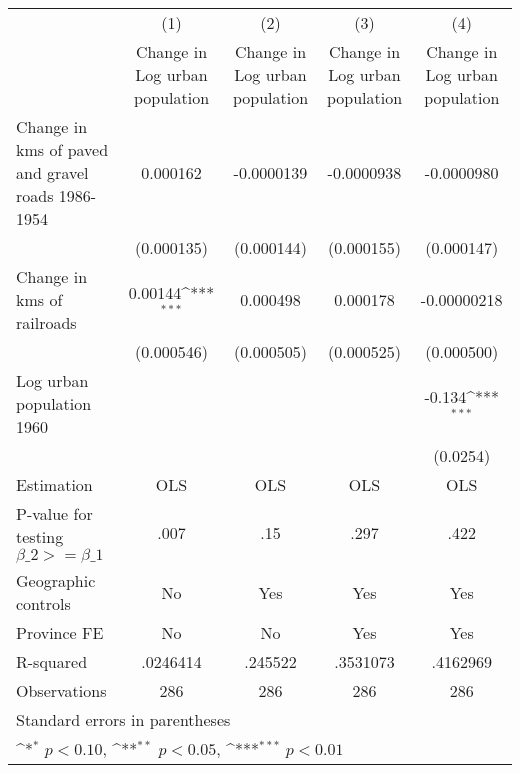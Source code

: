 {
\def\sym#1{\ifmmode^{#1}\else\(^{#1}\)\fi}
\begin{tabular}{l*{4}{c}}
\hline\hline
                    &\multicolumn{1}{c}{(1)}&\multicolumn{1}{c}{(2)}&\multicolumn{1}{c}{(3)}&\multicolumn{1}{c}{(4)}\\
                    &\multicolumn{1}{c}{Change in Log urban population}&\multicolumn{1}{c}{Change in Log urban population}&\multicolumn{1}{c}{Change in Log urban population}&\multicolumn{1}{c}{Change in Log urban population}\\
\hline
Change in kms of paved and gravel roads 1986-1954&    0.000162         &  -0.0000139         &  -0.0000938         &  -0.0000980         \\
                    &  (0.000135)         &  (0.000144)         &  (0.000155)         &  (0.000147)         \\
[1em]
Change in kms of railroads&     0.00144\sym{***}&    0.000498         &    0.000178         & -0.00000218         \\
                    &  (0.000546)         &  (0.000505)         &  (0.000525)         &  (0.000500)         \\
[1em]
Log urban population 1960&                     &                     &                     &      -0.134\sym{***}\\
                    &                     &                     &                     &    (0.0254)         \\
\hline
Estimation          &         OLS         &         OLS         &         OLS         &         OLS         \\
P-value for testing $\beta\_2 >= \beta\_1$&        .007         &         .15         &        .297         &        .422         \\
Geographic controls &          No         &         Yes         &         Yes         &         Yes         \\
Province FE         &          No         &          No         &         Yes         &         Yes         \\
R-squared           &    .0246414         &     .245522         &    .3531073         &    .4162969         \\
Observations        &         286         &         286         &         286         &         286         \\
\hline\hline
\multicolumn{5}{l}{\footnotesize Standard errors in parentheses}\\
\multicolumn{5}{l}{\footnotesize \sym{*} \(p<0.10\), \sym{**} \(p<0.05\), \sym{***} \(p<0.01\)}\\
\end{tabular}
}
